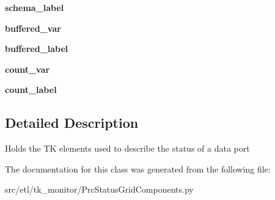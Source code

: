 \begin{DoxyCompactItemize}
\item 
\hypertarget{classetl_1_1tk__monitor_1_1PrcStatusGridComponents_1_1DataPortInGrid_acd40fadd12396e0cdf3df133002cd560}{{\bfseries schema\-\_\-label}}\label{classetl_1_1tk__monitor_1_1PrcStatusGridComponents_1_1DataPortInGrid_acd40fadd12396e0cdf3df133002cd560}

\item 
\hypertarget{classetl_1_1tk__monitor_1_1PrcStatusGridComponents_1_1DataPortInGrid_abbdaea15df60b10b28055095cc527ccb}{{\bfseries buffered\-\_\-var}}\label{classetl_1_1tk__monitor_1_1PrcStatusGridComponents_1_1DataPortInGrid_abbdaea15df60b10b28055095cc527ccb}

\item 
\hypertarget{classetl_1_1tk__monitor_1_1PrcStatusGridComponents_1_1DataPortInGrid_af7733c0942059803d1ba14e908155efd}{{\bfseries buffered\-\_\-label}}\label{classetl_1_1tk__monitor_1_1PrcStatusGridComponents_1_1DataPortInGrid_af7733c0942059803d1ba14e908155efd}

\item 
\hypertarget{classetl_1_1tk__monitor_1_1PrcStatusGridComponents_1_1DataPortInGrid_a8a8da5682a801bd0e660e4c70903b239}{{\bfseries count\-\_\-var}}\label{classetl_1_1tk__monitor_1_1PrcStatusGridComponents_1_1DataPortInGrid_a8a8da5682a801bd0e660e4c70903b239}

\item 
\hypertarget{classetl_1_1tk__monitor_1_1PrcStatusGridComponents_1_1DataPortInGrid_a3d638ac7841be52253dc39c0236d26c6}{{\bfseries count\-\_\-label}}\label{classetl_1_1tk__monitor_1_1PrcStatusGridComponents_1_1DataPortInGrid_a3d638ac7841be52253dc39c0236d26c6}

\end{DoxyCompactItemize}


\subsection{Detailed Description}
\begin{DoxyVerb}Holds the TK elements used to describe the status of a data port\end{DoxyVerb}
 

The documentation for this class was generated from the following file\-:\begin{DoxyCompactItemize}
\item 
src/etl/tk\-\_\-monitor/Prc\-Status\-Grid\-Components.\-py\end{DoxyCompactItemize}
